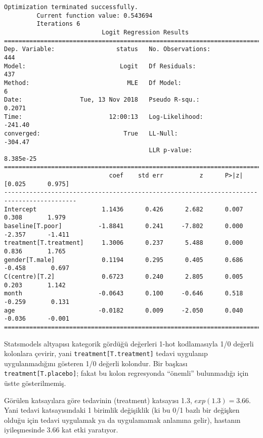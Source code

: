 \documentclass[12pt,fleqn]{article}\usepackage{../../common}
\begin{document}
\begin{verbatim}
Optimization terminated successfully.
         Current function value: 0.543694
         Iterations 6
                           Logit Regression Results                           
==============================================================================
Dep. Variable:                 status   No. Observations:                  444
Model:                          Logit   Df Residuals:                      437
Method:                           MLE   Df Model:                            6
Date:                Tue, 13 Nov 2018   Pseudo R-squ.:                  0.2071
Time:                        12:00:13   Log-Likelihood:                -241.40
converged:                       True   LL-Null:                       -304.47
                                        LLR p-value:                 8.385e-25
==========================================================================================
                             coef    std err          z      P>|z|      [0.025      0.975]
------------------------------------------------------------------------------------------
Intercept                  1.1436      0.426      2.682      0.007       0.308       1.979
baseline[T.poor]          -1.8841      0.241     -7.802      0.000      -2.357      -1.411
treatment[T.treatment]     1.3006      0.237      5.488      0.000       0.836       1.765
gender[T.male]             0.1194      0.295      0.405      0.686      -0.458       0.697
C(centre)[T.2]             0.6723      0.240      2.805      0.005       0.203       1.142
month                     -0.0643      0.100     -0.646      0.518      -0.259       0.131
age                       -0.0182      0.009     -2.050      0.040      -0.036      -0.001
==========================================================================================
\end{verbatim}

Statsmodels altyapısı kategorik gördüğü değerleri 1-hot kodlamasıyla 1/0
değerli kolonlara çevirir, yani \verb!treatment[T.treatment]! tedavi
uygulanıp uygulanmadığını gösteren 1/0 değerli kolondur. Bir başkası
\verb!treatment[T.placebo]!; fakat bu kolon regresyonda ``önemli''
bulunmadığı için üstte gösterilmemiş. 

Görülen katsayılara göre tedavinin (treatment) katsayısı 1.3,
$exp(1.3)=3.66$. Yani tedavi katsayısındaki 1 birimlik değişiklik (ki bu
0/1 bazlı bir değişken olduğu için tedavi uygulamak ya da uygulamamak
anlamına gelir), hastanın iyileşmesinde 3.66 kat etki yaratıyor.
\end{document}
